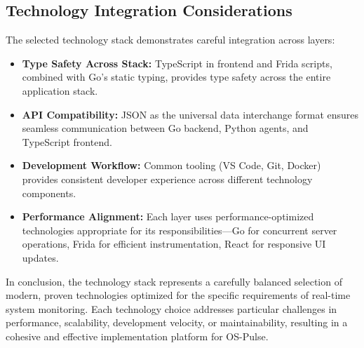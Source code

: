 \subsection{Technology Integration Considerations}

The selected technology stack demonstrates careful integration across layers:

\begin{itemize}
    \item \textbf{Type Safety Across Stack:} TypeScript in frontend and Frida scripts, combined with Go's static typing, provides type safety across the entire application stack.
    \item \textbf{API Compatibility:} JSON as the universal data interchange format ensures seamless communication between Go backend, Python agents, and TypeScript frontend.
    \item \textbf{Development Workflow:} Common tooling (VS Code, Git, Docker) provides consistent developer experience across different technology components.
    \item \textbf{Performance Alignment:} Each layer uses performance-optimized technologies appropriate for its responsibilities—Go for concurrent server operations, Frida for efficient instrumentation, React for responsive UI updates.
\end{itemize}

In conclusion, the technology stack represents a carefully balanced selection of modern, proven technologies optimized for the specific requirements of real-time system monitoring. Each technology choice addresses particular challenges in performance, scalability, development velocity, or maintainability, resulting in a cohesive and effective implementation platform for OS-Pulse.